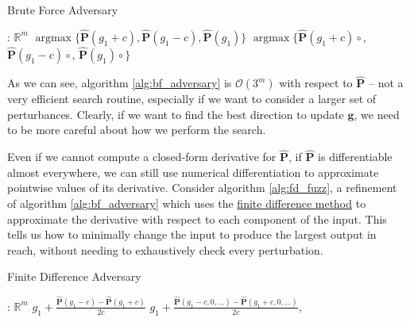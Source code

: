 \begin{algorithm}[H]
\caption{Brute Force Adversary}
\label{alg:bf_adversary}
\begin{algorithmic}[1]
: $\mathbb{R}^m$
 
\State \Return $\operatorname{argmax}\{\mathbf{\hat P}(g_1 + c), \mathbf{\hat P}(g_1 - c), \mathbf{\hat P}(g_1)\}$
\Else {}
\State \Return $\operatorname{argmax}\{\mathbf{\hat P}(g_1 + c) \circ$,\newline
\hspace*{10em} $\mathbf{\hat P}(g_1 - c)\circ$,\newline
\hspace*{10em} $\mathbf{\hat P}(g_1)\circ$$\}$
\EndIf
\EndProcedure
\end{algorithmic}
\end{algorithm}

As we can see, algorithm \autoref{alg:bf_adversary} is $\mathcal{O}(3^m)$ with respect to $\mathbf{\hat P}$ -- not a very efficient search routine, especially if we want to consider a larger set of perturbances. Clearly, if we want to find the best direction to update $\mathbf g$, we need to be more careful about how we perform the search.

Even if we cannot compute a closed-form derivative for $\mathbf{\hat P}$, if $\mathbf{\hat P}$ is differentiable almost everywhere, we can still use numerical differentiation to approximate pointwise values of its derivative. Consider algorithm \autoref{alg:fd_fuzz}, a refinement of algorithm \autoref{alg:bf_adversary} which uses the \hyperref[sec:fdm]{finite difference method} to approximate the derivative with respect to each component of the input. This tells us how to minimally change the input to produce the largest output in reach, without needing to exhaustively check every perturbation.

\begin{algorithm}[H]
\caption{Finite Difference Adversary}
\label{alg:fd_fuzz}
\begin{algorithmic}[1]
: $\mathbb{R}^m$
 
\State \Return $g_1 + \frac{\mathbf{\hat P}(g_1 - c) - \mathbf{\hat P}(g_1 + c)}{2c}$
\Else {}
\State \Return $g_1 + \frac{\mathbf{\hat P}(g_1 - c, 0, \ldots) - \mathbf{\hat P}(g_1 + c, 0, \ldots)}{2c}$, 
\EndIf
\EndProcedure
\end{algorithmic}
\end{algorithm}

